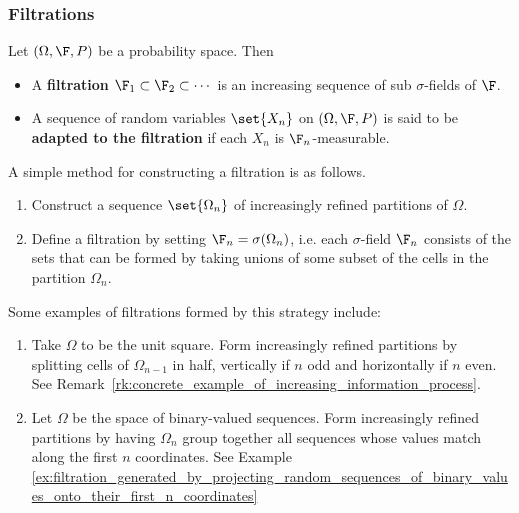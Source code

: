 \documentclass{article} %
\begin{document}
\subsubsection{Filtrations}

\begin{definitions}
Let $(\Omega, \F, P)$ be a probability space.  Then 

\begin{itemize}
\item A \textbf{filtration} $\F_1 \subset \F_2 \subset \cdots$ is an increasing sequence of sub $\sigma$-fields of $\F$. 
\item A sequence of random variables $\set{X_n}$ on $(\Omega, \F, P)$  is said to be \textbf{adapted to the filtration} if each $X_n$ is $\F_n$-measurable.
\end{itemize}
	
\end{definitions}

\begin{remark}

A simple method for constructing a filtration is as follows. 
%
\begin{enumerate}
	\item Construct a sequence $\set{\Omega_n}$ of increasingly refined partitions of $\Omega$.
	\item Define a filtration by setting $\F_n = \sigma(\Omega_n)$, i.e. each $\sigma$-field $\F_n$ consists of the sets that can be formed by taking unions of some subset of the cells in the partition $\Omega_n$.
\end{enumerate}
%
Some examples of filtrations formed by this strategy include:
%
\begin{enumerate}
	\item Take $\Omega$ to be the unit square. Form increasingly refined partitions by splitting cells of $\Omega_{n-1}$ in half, vertically if $n$ odd and horizontally if $n$ even.  See Remark~\ref{rk:concrete_example_of_increasing_information_process}. 
	\item  Let $\Omega$ be the space of binary-valued sequences. Form increasingly refined partitions by having $\Omega_{n}$ group together all sequences whose values match along the first $n$ coordinates. See Example \ref{ex:filtration_generated_by_projecting_random_sequences_of_binary_values_onto_their_first_n_coordinates}
\end{enumerate}


\end{remark}
\end{document}
